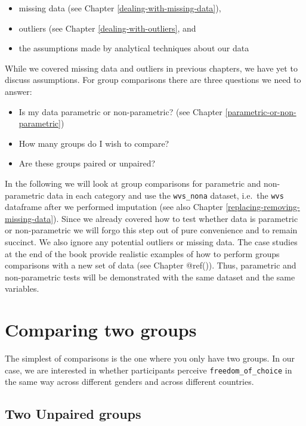 \documentclass[
]{book}
\begin{document}
\begin{itemize}
\item
  missing data (see Chapter \ref{dealing-with-missing-data}),
\item
  outliers (see Chapter \ref{dealing-with-outliers}, and
\item
  the assumptions made by analytical techniques about our data
\end{itemize}

While we covered missing data and outliers in previous chapters, we have yet to discuss assumptions. For group comparisons there are three questions we need to answer:

\begin{itemize}
\item
  Is my data parametric or non-parametric? (see Chapter \ref{parametric-or-non-parametric})
\item
  How many groups do I wish to compare?
\item
  Are these groups paired or unpaired?
\end{itemize}

In the following we will look at group comparisons for parametric and non-parametric data in each category and use the \texttt{wvs\_nona} dataset, i.e.~the \texttt{wvs} dataframe after we performed imputation (see also Chapter \ref{replacing-removing-missing-data}). Since we already covered how to test whether data is parametric or non-parametric we will forgo this step out of pure convenience and to remain succinct. We also ignore any potential outliers or missing data. The case studies at the end of the book provide realistic examples of how to perform groups comparisons with a new set of data (see Chapter @ref()). Thus, parametric and non-parametric tests will be demonstrated with the same dataset and the same variables.

\hypertarget{comparing-two-groups}{%
\section{Comparing two groups}\label{comparing-two-groups}}

The simplest of comparisons is the one where you only have two groups. In our case, we are interested in whether participants perceive \texttt{freedom\_of\_choice} in the same way across different genders and across different countries.

\hypertarget{two-unpaired-groups}{%
\subsection{Two Unpaired groups}\label{two-unpaired-groups}}
\end{document}
